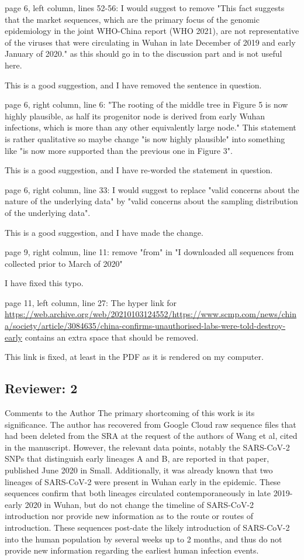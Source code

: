 \documentclass[11pt, oneside]{article}   	%
\newcommand{\response}[1]{{\color{black}#1}}
\begin{document}
page 6, left column, lines 52-56: I would suggest to remove "This fact suggests that the market sequences, which are the primary focus of the genomic epidemiology in the joint WHO-China report (WHO 2021), are not representative of the viruses that were circulating in Wuhan in late December of 2019 and early January of 2020." as this should go in to the discussion part and is not useful here.

\response{This is a good suggestion, and I have removed the sentence in question.}

page 6, right column, line 6: "The rooting of the middle tree in Figure 5 is now highly plausible, as half its progenitor node is derived from early Wuhan infections, which is more than any other equivalently large node." This statement is rather qualitative so maybe change  "is now highly plausible" into something like "is now more supported than the previous one in Figure 3".

\response{This is a good suggestion, and I have re-worded the statement in question.}

page 6, right column, line 33: I would suggest to replace "valid concerns about the nature of the underlying data" by "valid concerns about the sampling distribution of the underlying data".

\response{This is a good suggestion, and I have made the change.}

page 9, right colmun, line 11: remove "from" in "I downloaded all sequences from collected prior to March of 2020"

\response{I have fixed this typo.}

page 11, left column, line 27: The hyper link for \url{https://web.archive.org/web/20210103124552/https://www.scmp.com/news/china/society/article/3084635/china-confirms-unauthorised-labs-were-told-destroy-early}  contains an extra space that should be removed.

\response{This link is fixed, at least in the PDF as it is rendered on my computer.}


\subsection*{Reviewer: 2}

Comments to the Author
The primary shortcoming of this work is its significance. The author has recovered from Google Cloud raw sequence files that had been deleted from the SRA at the request of the authors of Wang et al, cited in the manuscript. However, the relevant data points, notably the SARS-CoV-2 SNPs that distinguish early lineages A and B, are reported in that paper, published June 2020 in Small. Additionally, it was already known that two lineages of SARS-CoV-2 were present in Wuhan early in the epidemic. These sequences confirm that both lineages circulated contemporaneously in late 2019-early 2020 in Wuhan, but do not change the timeline of SARS-CoV-2 introduction nor provide new information as to the route or routes of introduction. These sequences post-date the likely introduction of SARS-CoV-2 into the human population by several weeks up to 2 months, and thus do not provide new information regarding the earliest human infection events.
\end{document}
